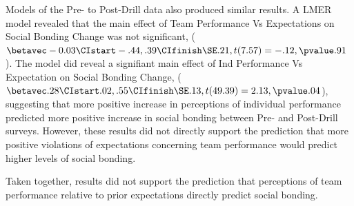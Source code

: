 \begin{CJK}{UTF8}{gbsn}




Models of the Pre- to Post-Drill data also produced similar results.  A LMER model revealed that the main effect of Team Performance Vs Expectations on Social Bonding Change was not significant, ($\betavec -0.03 \CIstart -.44, .39 \CIfinish \SE .21, t(7.57) = -.12, \pvalue .91$). The model did reveal a signifiant main effect of Ind Performance Vs Expectation on Social Bonding Change, ($\betavec .28 \CIstart .02, .55 \CIfinish \SE .13, t(49.39) = 2.13, \pvalue .04$), suggesting that more positive increase in perceptions of individual performance predicted more positive increase in social bonding between Pre- and Post-Drill surveys.  However, these results did not directly support the prediction that more positive violations of expectations concerning team performance would predict higher levels of social bonding.

Taken together, results did not support the prediction that perceptions of team performance relative to prior expectations directly predict social bonding.




\end{CJK}
